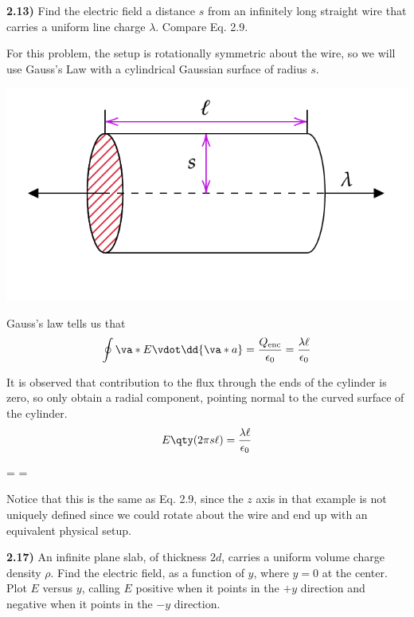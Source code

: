 \documentclass[12pt,a4paper]{article}
\newcommand{\prob}[2]{\textbf{#1)} #2}
\begin{document}
\prob{2.13}{Find the electric field a distance $s$ from an infinitely long straight wire that carries a uniform line charge $\lambda$. Compare Eq. 2.9.}

For this problem, the setup is rotationally symmetric about the wire, so we will use Gauss's Law with a cylindrical Gaussian surface of radius $s$.

\bef
\includegraphics[scale=0.5]{fig1.png}
\eef

Gauss's law tells us that
\begin{align*}
\oint \va*{E} \vdot \dd{\va*{a}} = \frac{Q_{\rm enc}}{\epsilon_0} = \frac{\lambda \ell}{\epsilon_0}
\end{align*}

It is observed that contribution to the flux through the ends of the cylinder is zero, so only obtain a radial component, pointing normal to the curved surface of the cylinder.
\begin{align*}
E\qty(2\pi s \ell) = \frac{\lambda \ell}{\epsilon_0}
\end{align*}

\begin{eqbox}
 =  \shat =  \shat
\end{eqbox}

Notice that this is the same as Eq. 2.9, since the $z$ axis in that example is not uniquely defined since we could rotate about the wire and end up with an equivalent physical setup.

\prob{2.17}{An infinite plane slab, of thickness $2d$, carries a uniform volume charge density $\rho$. Find the electric field, as a function of $y$, where $y = 0$ at the center. Plot $E$ versus $y$, calling $E$ positive when it points in the $+y$ direction and negative when it points in the $-
y$ direction.}
\end{document}
